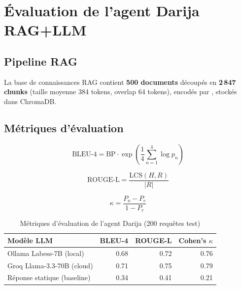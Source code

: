 \section{Évaluation de l'agent Darija RAG+LLM}
\label{sec:eval_darija}

\subsection{Pipeline RAG}

La base de connaissances RAG contient \textbf{500 documents}
découpés en \textbf{2\,847 chunks} (taille moyenne 384 tokens, overlap 64 tokens),
encodés par ,
stockés dans ChromaDB.

\subsection{Métriques d'évaluation}

\begin{definition}[BLEU-4]
\begin{equation}
\text{BLEU-4} = \text{BP} \cdot \exp\left(\frac{1}{4}\sum_{n=1}^{4}\log p_n\right)
\label{eq:bleu}
\end{equation}
\end{definition}

\begin{definition}[ROUGE-L]
\begin{equation}
\text{ROUGE-L} = \frac{\text{LCS}(H, R)}{|R|}
\label{eq:rouge}
\end{equation}
\end{definition}

\begin{equation}
\kappa = \frac{P_o - P_e}{1 - P_e}
\label{eq:kappa}
\end{equation}

\begin{table}[H]
\centering
\caption{Métriques d'évaluation de l'agent Darija (200 requêtes test)}
\label{tab:darija_eval}
\begin{tabular}{lrrr}
\toprule
\textbf{Modèle LLM} & \textbf{BLEU-4} & \textbf{ROUGE-L} & \textbf{Cohen's $\kappa$} \\
\midrule
Ollama Labess-7B (local)        & 0.68 & 0.72 & 0.76 \\
Groq Llama-3.3-70B (cloud)      & 0.71 & 0.75 & 0.79 \\
Réponse statique (baseline)     & 0.34 & 0.41 & 0.21 \\
\bottomrule
\end{tabular}
\end{table}

